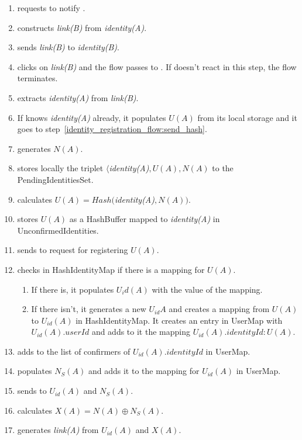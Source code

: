 \documentclass[a4paper,10pt]{article}
\newcommand{\identity}[1]{{\em identity(#1)}}
\newcommand{\link}[1]{{\em link(#1)}}
\begin{document}
\begin{enumerate}
 \item \User[A] requests \Client[A] to notify \User[B].
 \item \Client[A] constructs \link{B} from \identity{A}.
 \item \Client[A] sends \link{B} to \identity{B}.
 \item \User[B] clicks on \link{B} and the flow passes to \Client[B]. If \User[B] doesn't react in this step, the flow terminates.
 \item \Client[B] extracts \identity{A} from \link{B}.
 \item If \Client[B] knows \identity{A} already, it populates $U(A)$ from its local storage and it goes to step~\ref{identity_registration_flow:send_hash}.
 \item \Client[B] generates $N(A)$.
 \item \Client[B] stores locally the triplet $\langle$\identity{A}$,U(A),N(A)$ to the PendingIdentitiesSet.
 \item \Client[B] calculates $U(A)=Hash($\identity{A}$,N(A))$.
 \item \Client[B] stores $U(A)$ as a HashBuffer mapped to \identity{A} in UnconfirmedIdentities.
 \item\label{identity_registration_flow:send_hash} \Client[B] sends to \Server{} request for registering $U(A)$.
 \item \Server{} checks in HashIdentityMap if there is a mapping for $U(A)$.
 \begin{enumerate}
  \item If there is, it populates $U_id(A)$ with the value of the mapping.
  \item If there isn't, it generates a new $U_{id}{A}$ and creates a mapping from $U(A)$ to $U_{id}(A)$ in HashIdentityMap. It creates an entry in UserMap with $U_{id}(A).userId$ 
and adds to it the mapping $U_{id}(A).identityId:U(A)$.
 \end{enumerate}
 \item \Server{} adds \Client[B] to the list of confirmers of $U_{id}(A).identityId$ in UserMap.
 \item \Server{} populates $N_S(A)$ and adds it to the mapping for $U_{id}(A)$ in UserMap.
 \item \Server{} sends to \Client[B] $U_{id}(A)$ and $N_S(A)$.
 \item \Client[B] calculates $X(A)=N(A)\oplus N_S(A)$.
 \item \Client[B] generates \link{A} from $U_{id}(A)$ and $X(A)$.

\end{enumerate}
\end{document}

